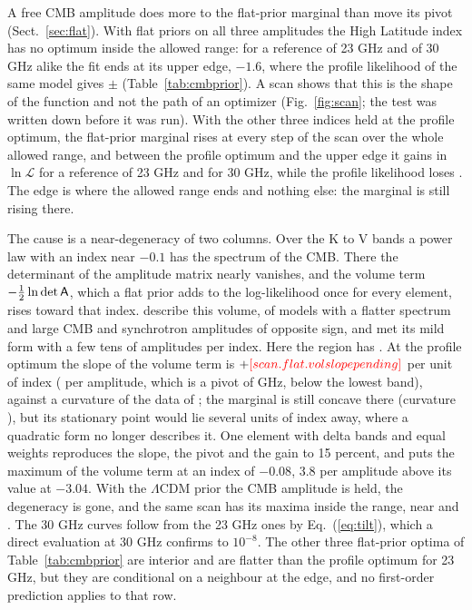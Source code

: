 A free CMB amplitude does more to the flat-prior marginal than move its pivot
(Sect.~\ref{sec:flat}). With flat priors on all three amplitudes the High Latitude index has no
optimum inside the allowed range: for a reference of 23 GHz and of 30 GHz alike the fit ends at its
upper edge, $-1.6$, where the profile likelihood of the same model gives  $\pm$
 (Table~\ref{tab:cmbprior}). A scan shows that this is the shape of the function and
not the path of an optimizer (Fig.~\ref{fig:scan}; the test was written down before it was run). With
the other three indices held at the profile optimum, the flat-prior marginal rises at every step of
the scan over the whole allowed range, and between the profile optimum and the upper edge it gains
 in $\ln\mathcal{L}$ for a reference of 23 GHz and  for 30
GHz, while the profile likelihood loses . The edge is where the allowed range
ends and nothing else: the marginal is still rising there.

The cause is a near-degeneracy of two columns. Over the K to V bands a power law with an index near
$-0.1$ has the spectrum of the CMB. There the determinant of the amplitude matrix nearly vanishes, and
the volume term $-\tfrac12\ln\det\mathsf{A}$, which a flat prior adds to the log-likelihood once for every
element, rises toward that index. \citet{dunkley2009} describe this volume, of models with a flatter
spectrum and large CMB and synchrotron amplitudes of opposite sign, and met its mild form with a few
tens of amplitudes per index. Here the region has . At the profile optimum the slope of
the volume term is $+\N{scan.flat.volslope}$ per unit of index ( per
amplitude, which is a pivot of  GHz, below the lowest band), against a curvature of
the data of ; the marginal is still concave there (curvature ), but
its stationary point would lie several units of index away, where a quadratic form no longer
describes it. One element with delta bands and equal weights reproduces the slope, the pivot and the
gain to 15 percent, and puts the maximum of the volume term at an index of $-0.08$, 3.8 per amplitude
above its value at $-3.04$. With the $\Lambda$CDM prior the CMB amplitude is held, the degeneracy is
gone, and the same scan has its maxima inside the range, near  and
. The 30 GHz curves follow from the 23 GHz ones by Eq.~(\ref{eq:tilt}), which a
direct evaluation at 30 GHz confirms to $10^{-8}$. The other three flat-prior optima of
Table~\ref{tab:cmbprior} are interior and are  flatter than the profile
optimum for 23 GHz, but they are conditional on a neighbour at the edge, and no first-order
prediction applies to that row.

